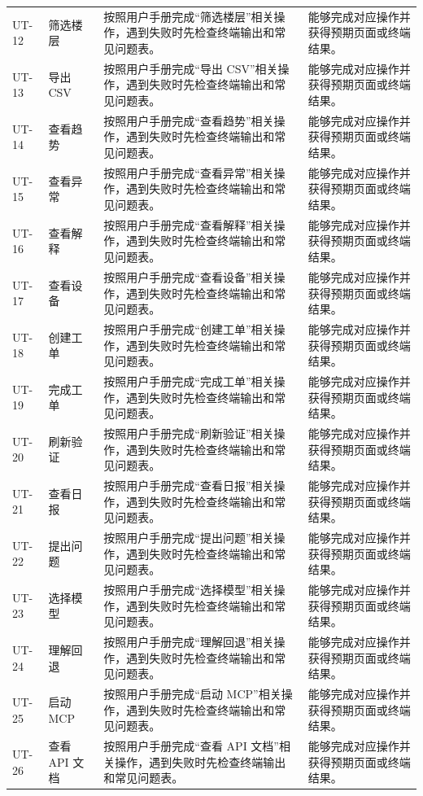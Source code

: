 \documentclass[12pt,a4paper]{ctexart}
\begin{document}
\begin{longtable}{L{1.8cm}L{3.2cm}L{6.4cm}L{4.0cm}}
UT-12 & 筛选楼层 & 按照用户手册完成“筛选楼层”相关操作，遇到失败时先检查终端输出和常见问题表。 & 能够完成对应操作并获得预期页面或终端结果。 \\
UT-13 & 导出 CSV & 按照用户手册完成“导出 CSV”相关操作，遇到失败时先检查终端输出和常见问题表。 & 能够完成对应操作并获得预期页面或终端结果。 \\
UT-14 & 查看趋势 & 按照用户手册完成“查看趋势”相关操作，遇到失败时先检查终端输出和常见问题表。 & 能够完成对应操作并获得预期页面或终端结果。 \\
UT-15 & 查看异常 & 按照用户手册完成“查看异常”相关操作，遇到失败时先检查终端输出和常见问题表。 & 能够完成对应操作并获得预期页面或终端结果。 \\
UT-16 & 查看解释 & 按照用户手册完成“查看解释”相关操作，遇到失败时先检查终端输出和常见问题表。 & 能够完成对应操作并获得预期页面或终端结果。 \\
UT-17 & 查看设备 & 按照用户手册完成“查看设备”相关操作，遇到失败时先检查终端输出和常见问题表。 & 能够完成对应操作并获得预期页面或终端结果。 \\
UT-18 & 创建工单 & 按照用户手册完成“创建工单”相关操作，遇到失败时先检查终端输出和常见问题表。 & 能够完成对应操作并获得预期页面或终端结果。 \\
UT-19 & 完成工单 & 按照用户手册完成“完成工单”相关操作，遇到失败时先检查终端输出和常见问题表。 & 能够完成对应操作并获得预期页面或终端结果。 \\
UT-20 & 刷新验证 & 按照用户手册完成“刷新验证”相关操作，遇到失败时先检查终端输出和常见问题表。 & 能够完成对应操作并获得预期页面或终端结果。 \\
UT-21 & 查看日报 & 按照用户手册完成“查看日报”相关操作，遇到失败时先检查终端输出和常见问题表。 & 能够完成对应操作并获得预期页面或终端结果。 \\
UT-22 & 提出问题 & 按照用户手册完成“提出问题”相关操作，遇到失败时先检查终端输出和常见问题表。 & 能够完成对应操作并获得预期页面或终端结果。 \\
UT-23 & 选择模型 & 按照用户手册完成“选择模型”相关操作，遇到失败时先检查终端输出和常见问题表。 & 能够完成对应操作并获得预期页面或终端结果。 \\
UT-24 & 理解回退 & 按照用户手册完成“理解回退”相关操作，遇到失败时先检查终端输出和常见问题表。 & 能够完成对应操作并获得预期页面或终端结果。 \\
UT-25 & 启动 MCP & 按照用户手册完成“启动 MCP”相关操作，遇到失败时先检查终端输出和常见问题表。 & 能够完成对应操作并获得预期页面或终端结果。 \\
UT-26 & 查看 API 文档 & 按照用户手册完成“查看 API 文档”相关操作，遇到失败时先检查终端输出和常见问题表。 & 能够完成对应操作并获得预期页面或终端结果。 \\

\end{longtable}
\end{document}
